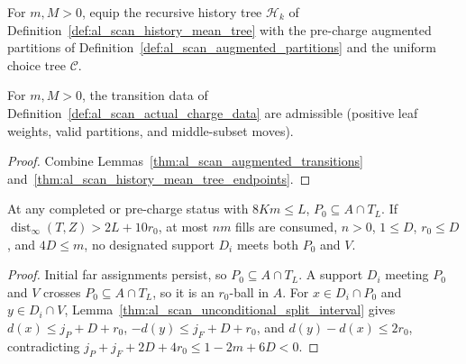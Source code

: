 \begin{definition}
    \label{def:al_scan_actual_charge_data}
    \leanok
    For $m,M>0$, equip the recursive history tree $\mathcal H_k$ of
    Definition~\ref{def:al_scan_history_mean_tree} with the pre-charge augmented
    partitions of Definition~\ref{def:al_scan_augmented_partitions} and the
    uniform choice tree $\mathcal C$.
\end{definition}

\begin{lemma}
    \label{thm:al_scan_actual_charge_admissible}
    \leanok
    For $m,M>0$, the transition data of
    Definition~\ref{def:al_scan_actual_charge_data} are admissible (positive
    leaf weights, valid partitions, and middle-subset moves).
\end{lemma}
\begin{proof}\leanok
    Combine Lemmas~\ref{thm:al_scan_augmented_transitions}
    and~\ref{thm:al_scan_history_mean_tree_endpoints}.
\end{proof}

\begin{lemma}
    \label{thm:al_scan_receiving_separation}
    \leanok
    At any completed or pre-charge status with $8Km\le L$, $P_0\subseteq A\cap T_L$.
    If $\operatorname{dist}_\infty(T,Z)>2L+10r_0$, at most $nm$ fills are
    consumed, $n>0$, $1\le D$, $r_0\le D$, and $4D\le m$, no designated support
    $D_i$ meets both $P_0$ and $V$.
\end{lemma}
\begin{proof}\leanok
    Initial far assignments persist, so $P_0\subseteq A\cap T_L$. A support
    $D_i$ meeting $P_0$ and $V$ crosses $P_0\subseteq A\cap T_L$, so it is an
    $r_0$-ball in $A$. For $x\in D_i\cap P_0$ and $y\in D_i\cap V$,
    Lemma~\ref{thm:al_scan_unconditional_split_interval} gives
    $d(x)\le j_P+D+r_0$, $-d(y)\le j_F+D+r_0$, and $d(y)-d(x)\le2r_0$,
    contradicting $j_P+j_F+2D+4r_0\le 1-2m+6D<0$.
\end{proof}

